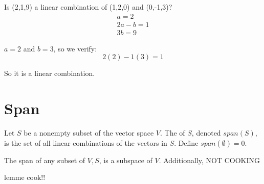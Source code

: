 \documentclass{article}
\begin{document}
\begin{example}[Vectors]
\end{example}

Is (2,1,9) a linear combination of (1,2,0) and (0,-1,3)?
\begin{align*}
    a = 2\\
    2a - b = 1\\
    3b = 9
\end{align*}

$a = 2$ and $b = 3$, so we verify:
\[
2(2) - 1(3) = 1
\]

So it is a linear combination.

\section{Span}
\begin{definition}
    Let $S$ be a nonempty subset of the vector space $V$. The  of $S$, denoted $span(S)$, is the set of all linear combinations of the vectors in $S$. Define $span(\emptyset) = 0$.
\end{definition}

\begin{theorem}
    The span of any subset of $V, S$, is a subspace of $V$. Additionally, NOT COOKING

    lemme cook!!
\end{theorem}
\end{document}
